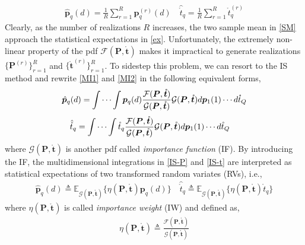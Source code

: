 \documentclass[review]{elsarticle}
\begin{document}
\begin{align}\label{SM}
    \hat{\boldsymbol{p}}_q(d)=\frac{1}{R}\sum_{r=1}^R \boldsymbol{p}_q^{(r)}(d) \quad \hat{\mathring{t}}_q=\frac{1}{R}\sum_{r=1}^R \mathring{t}_q^{(r)}
\end{align}
Clearly, as the number of realizations $R$ increases, the two sample mean in \eqref{SM} approach the statistical expectations in \eqref{ex}. Unfortunately, the extremely non-linear property of the pdf $\mathcal{F}(\boldsymbol{P},\mathring{\boldsymbol{t}})$ makes it impractical to generate realizations $\lbrace \boldsymbol{P}^{(r)}\rbrace_{r=1}^R$ and $\lbrace \mathring{\boldsymbol{t}}^{(r)}\rbrace_{r=1}^R$. To sidestep this problem, we can resort to the IS method \cite{Kay2000Mean,ISdoa2008} and rewrite \eqref{MI1} and \eqref{MI2} in the following equivalent forms,
\begin{align}\label{IS-P}
    \hat{\boldsymbol{p}}_q(d)=\idotsint \boldsymbol{p}_q(d) \frac{\mathcal{F}(\boldsymbol{P},\mathring{\boldsymbol{t}})}{\mathcal{G}(\boldsymbol{P},\mathring{\boldsymbol{t}})}\mathcal{G}(\boldsymbol{P},\mathring{\boldsymbol{t}})d\boldsymbol{p}_1(1) \cdots d\mathring{t}_Q
\end{align}
\begin{align}\label{IS-t}    
    \hat{\mathring{t}}_q&=\idotsint \mathring{t}_q \frac{\mathcal{F}(\boldsymbol{P},\mathring{\boldsymbol{t}})}{\mathcal{G}(\boldsymbol{P},\mathring{\boldsymbol{t}})}\mathcal{G}(\boldsymbol{P},\mathring{\boldsymbol{t}})d\boldsymbol{p}_1(1) \cdots d\mathring{t}_Q
\end{align}
where $\mathcal{G}(\boldsymbol{P},\mathring{\boldsymbol{t}})$ is another pdf called \emph{importance function} (IF). By introducing the IF, the multidimensional integrations in \eqref{IS-P} and \eqref{IS-t} are interpreted as statistical expectations of two transformed random variates (RVs), i.e.,
\begin{align}\label{IS-ex}
    \hat{\boldsymbol{p}}_q(d)\triangleq \mathbb{E}_{\mathcal{G}(\boldsymbol{P},\mathring{\boldsymbol{t}})}\{\eta(\boldsymbol{P},\mathring{\boldsymbol{t}})\boldsymbol{p}_q(d)\} \quad \hat{\mathring{t}}_q\triangleq \mathbb{E}_{\mathcal{G}(\boldsymbol{P},\mathring{\boldsymbol{t}})}\{\eta(\boldsymbol{P},\mathring{\boldsymbol{t}})\mathring{t}_q\}
\end{align}
where $\eta(\boldsymbol{P},\mathring{\boldsymbol{t}})$ is called \emph{importance weight} (IW) and defined as,
\begin{align}\label{eta}
    \eta(\boldsymbol{P},\mathring{\boldsymbol{t}})\triangleq\frac{\mathcal{F}(\boldsymbol{P},\mathring{\boldsymbol{t}})}{\mathcal{G}(\boldsymbol{P},\mathring{\boldsymbol{t}})}
\end{align}
\end{document}
